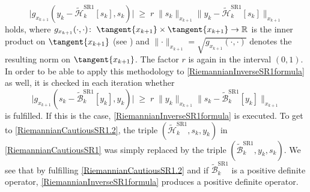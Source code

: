 \begin{equation}\label{RiemannianCautiousSR1}
    \lvert g_{x_{k+1}}(y_k - \widetilde{\mathcal{H}}^\mathrm{SR1}_k [s_k], s_k) \lvert \; \geq \; r \; \lVert s_k \rVert_{x_{k+1}} \lVert y_k - \widetilde{\mathcal{H}}^\mathrm{SR1}_k [s_k] \rVert_{x_{k+1}} 
\end{equation}
holds, where $g_{x_{k+1}}(\cdot, \cdot) \colon \; \tangent{x_{k+1}} \times \tangent{x_{k+1}} \to \mathbb{R}$ is the inner product on $\tangent{x_{k+1}}$ (see \cite[p.~6]{BergmannHerzogLouzeiroSilvaTenbrinckVidalNunez:2020:1}) and $ \lVert \cdot \rVert_{x_{k+1}} = \sqrt{g_{x_{k+1}}(\cdot, \cdot)}$ denotes the resulting norm on $\tangent{x_{k+1}}$. The factor $r$ is again in the interval $(0,1)$. In order to be able to apply this methodology to \cref{RiemannianInverseSR1formula} as well, it is checked in each iteration whether 
\begin{equation}\label{RiemannianCautiousSR1.2}
    \lvert g_{x_{k+1}}(s_k - \widetilde{\mathcal{B}}^\mathrm{SR1}_k [y_k], y_k) \lvert \; \geq \; r \; \lVert y_k \rVert_{x_{k+1}} \lVert s_k - \widetilde{\mathcal{B}}^\mathrm{SR1}_k [y_k] \rVert_{x_{k+1}} 
\end{equation}
is fulfilled. If this is the case, \cref{RiemannianInverseSR1formula} is executed. To get to \cref{RiemannianCautiousSR1.2}, the triple $(\widetilde{\mathcal{H}}^\mathrm{SR1}_k, s_k, y_k)$ in \cref{RiemannianCautiousSR1} was simply replaced by the triple $(\widetilde{\mathcal{B}}^\mathrm{SR1}_k, y_k, s_k)$. We see that by fulfilling \cref{RiemannianCautiousSR1.2} and if $\widetilde{\mathcal{B}}^\mathrm{SR1}_k$ is a positive definite operator, \cref{RiemannianInverseSR1formula} produces a positive definite operator.